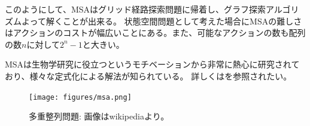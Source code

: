 \documentclass[10pt]{book}
\begin{document}
このようにして、MSAはグリッド経路探索問題に帰着し、グラフ探索アルゴリズムよって解くことが出来る。
状態空間問題として考えた場合にMSAの難しさはアクションのコストが幅広いことにある。また、可能なアクションの数も配列の数$n$に対して$2^n-1$と大きい。

MSAは生物学研究に役立つというモチベーションから非常に熱心に研究されており、様々な定式化による解法が知られている。
詳しくは\cite{waterman1995introduction,
gusfield1997algorithms,edgar2006multiple}を参照されたい。


\begin{figure}
\centering
\texttt{[image: figures/msa.png]}
\caption{多重整列問題: 画像はwikipediaより。}
\label{fig:msa-gif}
\end{figure}


\begin{figure}
\centering
{} \hspace{4pt}
 \hspace{4pt}
\end{figure}
\end{document}

